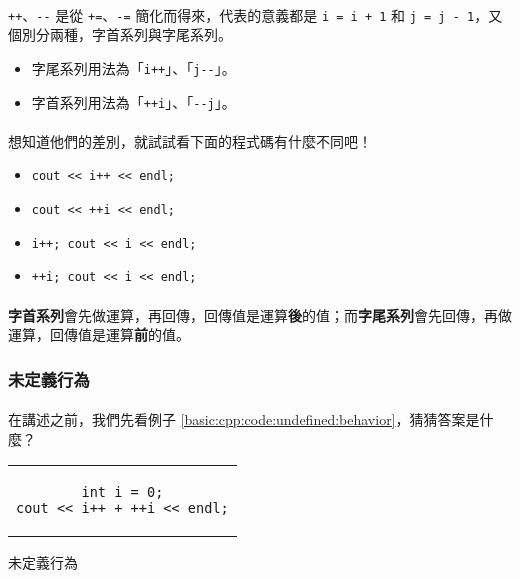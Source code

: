 \documentclass[12pt,a4paper,oneside]{article}
\begin{document}
\begin{CJK}{UTF8}{bkai}
\paragraph{}\lstinline!++!、\lstinline!--! 是從 \lstinline!+=!、\lstinline!-=! 簡化而得來，代表的意義都是 \lstinline!i = i + 1! 和 \lstinline!j = j - 1!，又個別分兩種，字首系列與字尾系列。

\begin{itemize}
\item 字尾系列用法為「\lstinline!i++!」、「\lstinline!j--!」。
\item 字首系列用法為「\lstinline!++i!」、「\lstinline!--j!」。
\end{itemize}

\paragraph{}想知道他們的差別，就試試看下面的程式碼有什麼不同吧！
\begin{itemize}
\item \lstinline!cout << i++ << endl;!
\item \lstinline!cout << ++i << endl;!
\item \lstinline!i++; cout << i << endl;!
\item \lstinline!++i; cout << i << endl;!
\end{itemize}

\paragraph{}\textbf{字首系列}會先做運算，再回傳，回傳值是運算\textbf{後}的值；而\textbf{字尾系列}會先回傳，再做運算，回傳值是運算\textbf{前}的值。

\subsubsection{未定義行為}

\paragraph{}在講述之前，我們先看例子 \ref{basic:cpp:code:undefined:behavior}，猜猜答案是什麼？

\begin{code}[h!]
\centering
\begin{tabular}{c}
\begin{lstlisting}
int i = 0;
cout << i++ + ++i << endl;
\end{lstlisting}
\end{tabular}
\caption{未定義行為}
\label{basic:cpp:code:undefined:behavior}
\end{code}
  

\end{CJK}
\end{document}
